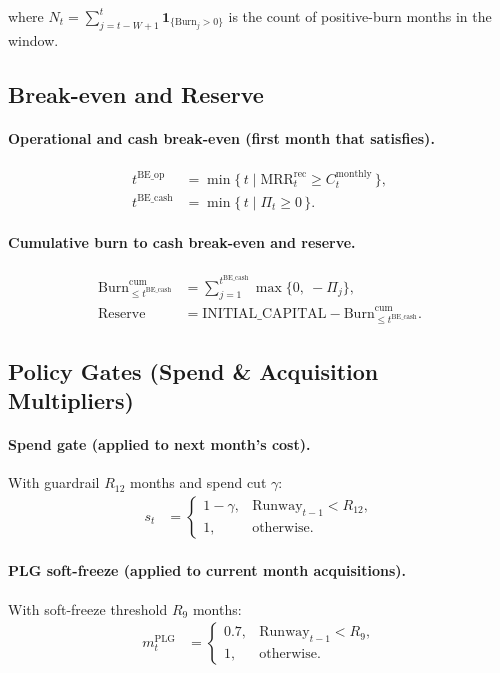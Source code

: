 where $N_t=\sum_{j=t-W+1}^{t}\mathbf{1}_{\{\mathrm{Burn}_j>0\}}$ is the count of positive-burn months in the window.

\subsection{Break-even and Reserve}
\paragraph{Operational and cash break-even (first month that satisfies).}
\begin{align}
t^{\mathrm{BE\_op}} 
  &= \min\{\, t \mid \mathrm{MRR}^{\mathrm{rec}}_t \ge C^{\mathrm{monthly}}_t \,\},\\
t^{\mathrm{BE\_cash}} 
  &= \min\{\, t \mid \Pi_t \ge 0 \,\}.
\end{align}

\paragraph{Cumulative burn to cash break-even and reserve.}
\begin{align}
\mathrm{Burn}^{\mathrm{cum}}_{\le t^{\mathrm{BE\_cash}}} 
  &= \sum_{j=1}^{t^{\mathrm{BE\_cash}}} \max\{0,\ -\Pi_j\},\\
\mathrm{Reserve}
  &= \text{INITIAL\_CAPITAL} - \mathrm{Burn}^{\mathrm{cum}}_{\le t^{\mathrm{BE\_cash}}}.
\end{align}

\subsection{Policy Gates (Spend \& Acquisition Multipliers)}
\paragraph{Spend gate (applied to next month’s cost).}
With guardrail $R_{12}$ months and spend cut $\gamma$:
\begin{align}
s_t 
  &= 
  \begin{cases}
    1-\gamma, & \mathrm{Runway}_{t-1} < R_{12},\\
    1, & \text{otherwise.}
  \end{cases}
\end{align}

\paragraph{PLG soft-freeze (applied to current month acquisitions).}
With soft-freeze threshold $R_{9}$ months:
\begin{align}
m^{\mathrm{PLG}}_t 
  &= 
  \begin{cases}
    0.7, & \mathrm{Runway}_{t-1} < R_{9},\\
    1, & \text{otherwise.}
  \end{cases}
\end{align}

